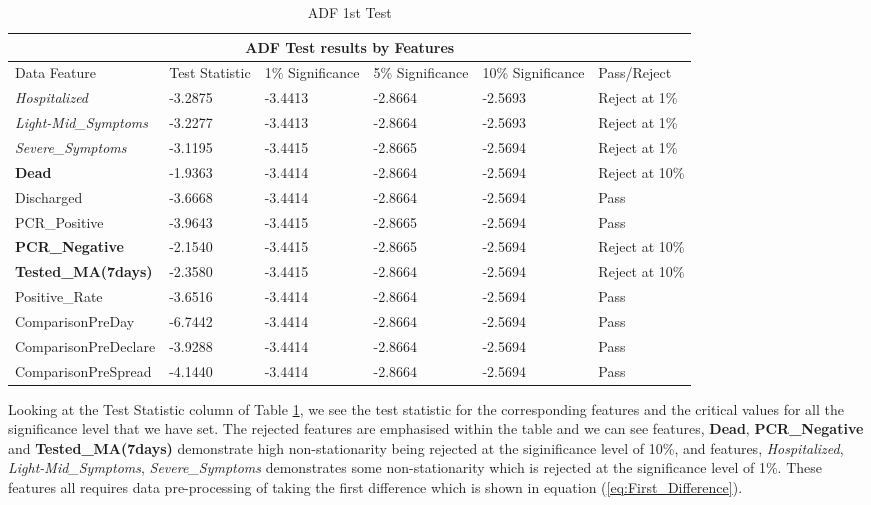 \begin{table}[ht]
\centering
\caption{\label{tab:ADF1st}ADF 1st Test}
\begin{tabular}{ |p{4cm}||p{1.7cm}|p{1.7cm}|p{1.7cm}|p{1.7cm}|p{2.3cm}| }
 \hline
 \multicolumn{6}{|c|}{ADF Test results by Features} \\
 \hline
 Data Feature & Test Statistic & 1\% Significance & 5\% Significance & 10\% Significance & Pass/Reject\\
 \hline
\textit{Hospitalized} & -3.2875 & -3.4413 & -2.8664 & -2.5693 & Reject at 1\% \\
\textit{Light-Mid\_Symptoms} & -3.2277 & -3.4413 & -2.8664 & -2.5693 & Reject at 1\% \\
\textit{Severe\_Symptoms} & -3.1195 & -3.4415 & -2.8665 & -2.5694 & Reject at 1\% \\
\textbf{Dead} & -1.9363 & -3.4414 & -2.8664 & -2.5694 & Reject at 10\% \\
Discharged & -3.6668 & -3.4414 & -2.8664 & -2.5694 & Pass \\
PCR\_Positive & -3.9643 & -3.4415 & -2.8665 & -2.5694 & Pass \\
\textbf{PCR\_Negative} & -2.1540 & -3.4415 & -2.8665 & -2.5694 & Reject at 10\% \\
\textbf{Tested\_MA(7days)} & -2.3580 & -3.4415 & -2.8664 & -2.5694 & Reject at 10\% \\
Positive\_Rate & -3.6516 & -3.4414 & -2.8664 & -2.5694 & Pass \\
ComparisonPreDay & -6.7442 & -3.4414 & -2.8664 & -2.5694 & Pass \\
ComparisonPreDeclare & -3.9288 & -3.4414 & -2.8664 & -2.5694 & Pass \\
ComparisonPreSpread & -4.1440 & -3.4414 & -2.8664 & -2.5694 & Pass \\
 \hline
\end{tabular}
\end{table}

Looking at the Test Statistic column of Table \ref{tab:ADF1st}, we see the test statistic for the corresponding features and the critical values for all the significance level that we have set. The rejected features are emphasised within the table and we can see features, \textbf{Dead}, \textbf{PCR\_Negative} and \textbf{Tested\_MA(7days)} demonstrate high non-stationarity being rejected at the siginificance level of 10\%, and features, \textit{Hospitalized}, \textit{Light-Mid\_Symptoms}, \textit{Severe\_Symptoms} demonstrates some non-stationarity which is rejected at the significance level of 1\%. These features all requires data pre-processing of taking the first difference which is shown in equation (\ref{eq:First_Difference}).

